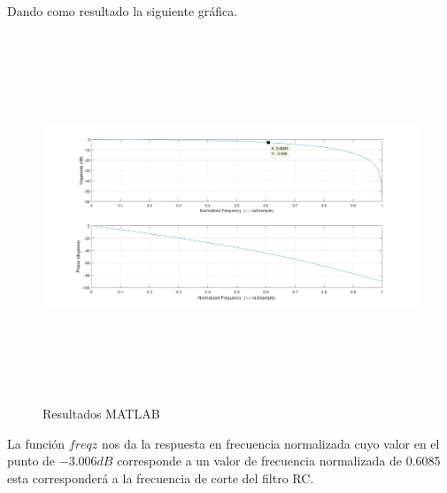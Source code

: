 \documentclass[12pt]{article}
\begin{document}


Dando como resultado la siguiente gráfica. 

\begin{figure}[h]
    \centering
    \includegraphics[width=16cm,height=11cm]{imagenes/matla}
    \caption{Resultados MATLAB }
    \label{fig:esquematico}
\end{figure}

La función $freqz$ nos da la respuesta en frecuencia normalizada cuyo valor en el punto de $-3.006dB$ corresponde a un valor de frecuencia normalizada de 0.6085 esta corresponderá a la frecuencia de corte del filtro RC.

\end{document}
